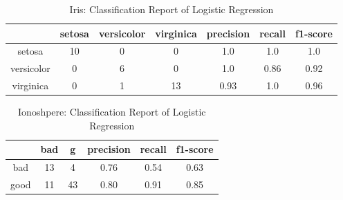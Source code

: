 \documentclass[english]{tktltiki2}
\theoremstyle{definition}
\theoremstyle{remark}
\begin{document}
\begin{table}[H]
	\caption{Iris: Classification Report of Logistic Regression}
	\label{tab:quantitative_experimentation_lr_iris_report}
	\begin{tabular}{@{}ccccccc@{}}
		\toprule
		& setosa & versicolor & virginica & precision & recall & f1-score \\ \hline
		
		\multicolumn{1}{|c|}{setosa} & \multicolumn{1}{c|}{10} & \multicolumn{1}{c|}{0} & \multicolumn{1}{c|}{0} & \multicolumn{1}{c|}{1.0} & \multicolumn{1}{c|}{1.0} & \multicolumn{1}{c|}{1.0} \\ \hline
		
		\multicolumn{1}{|c|}{versicolor} & \multicolumn{1}{c|}{0} & \multicolumn{1}{c|}{6} & \multicolumn{1}{c|}{0} & \multicolumn{1}{c|}{1.0} & \multicolumn{1}{c|}{0.86} & \multicolumn{1}{c|}{0.92} \\ \hline
		
		\multicolumn{1}{|c|}{virginica} & \multicolumn{1}{c|}{0} & \multicolumn{1}{c|}{1} & \multicolumn{1}{c|}{13} & \multicolumn{1}{c|}{0.93} & \multicolumn{1}{c|}{1.0} & \multicolumn{1}{c|}{0.96} \\ \hline
	\end{tabular}
\end{table}

\begin{table}[H]
	\begin{center}
		\caption{Ionoshpere: Classification Report of Logistic Regression}
		\label{tab:quantitative_experimentation_lr_iono_report}
		\begin{tabular}{@{}cccccc@{}}
			\toprule
			& bad & g & precision & recall & f1-score \\ \hline
			\multicolumn{1}{|c|}{bad} & \multicolumn{1}{c|}{13} & \multicolumn{1}{c|}{4} & \multicolumn{1}{c|}{0.76} & \multicolumn{1}{c|}{0.54} & \multicolumn{1}{c|}{0.63} \\ \hline
			\multicolumn{1}{|c|}{good} & \multicolumn{1}{c|}{11} & \multicolumn{1}{c|}{43} & \multicolumn{1}{c|}{0.80} & \multicolumn{1}{c|}{0.91} & \multicolumn{1}{c|}{0.85} \\ \hline
		\end{tabular}
	\end{center}
\end{table}

\end{document}
